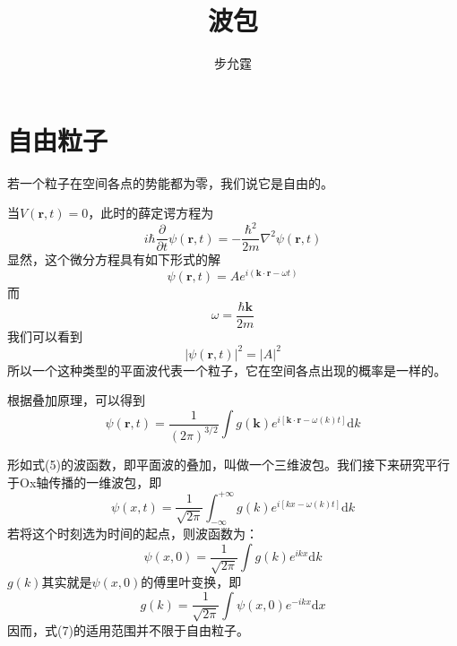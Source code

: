 \documentclass[]{article}
\title{波包}
\author{步允霆}
\begin{document}
	
	\maketitle
\section{自由粒子}
若一个粒子在空间各点的势能都为零，我们说它是自由的。\par 
当$V(\mathbf{r},t)=0$，此时的薛定谔方程为
\begin{equation}
	i\hbar\dfrac{\partial}{\partial t}\psi(\mathbf{r},t)=-\dfrac{\hbar^2}{2m}\nabla^2\psi(\mathbf{r},t)
\end{equation}
显然，这个微分方程具有如下形式的解
\begin{equation}
	\psi(\mathbf{r},t)=Ae^{i(\mathbf{k\cdot r}-\omega t)}
\end{equation}
而
\begin{equation}
	\omega=\dfrac{\hbar\mathbf{k}}{2m}
\end{equation}
我们可以看到
\begin{equation}
	|\psi(\mathbf{r},t)|^2=|A|^2
\end{equation}
所以一个这种类型的平面波代表一个粒子，它在空间各点出现的概率是一样的。\par 
根据叠加原理，可以得到
\begin{equation}
	\psi(\mathbf{r},t)=\dfrac{1}{(2\pi)^{3/2}}\int g(\mathbf{k})e^{i[\mathbf{k\cdot r}-\omega (k)t]}\mathrm{d}k
\end{equation}

形如式(5)的波函数，即平面波的叠加，叫做一个三维波包。我们接下来研究平行于Ox轴传播的一维波包，即
\begin{equation}
	\psi(x,t)=\dfrac{1}{\sqrt{2\pi}}\int^{+\infty}_{-\infty} g(k)e^{i[kx-\omega (k)t]}\mathrm{d}k
\end{equation}
若将这个时刻选为时间的起点，则波函数为：
\begin{equation}
	\psi(x,0)=\dfrac{1}{\sqrt{2\pi}}\int g(k)e^{ikx}\mathrm{d}k
\end{equation}
$g(k)$其实就是$\psi(x,0)$的傅里叶变换，即
\begin{equation}
	g(k)=\dfrac{1}{\sqrt{2\pi}}\int \psi(x,0)e^{-ikx}\mathrm{d}x
\end{equation}
因而，式(7)的适用范围并不限于自由粒子。
\end{document}
